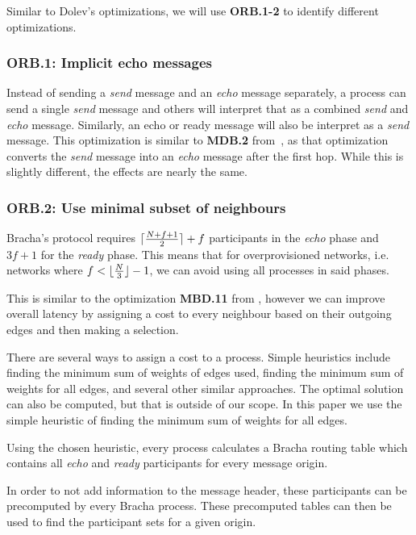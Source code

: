 Similar to Dolev's optimizations, we will use \textbf{ORB.1-2} to identify different optimizations.

\subsubsection{ORB.1: Implicit echo messages}
Instead of sending a \textit{send} message and an \textit{echo} message separately, a process can send a single \textit{send} message and others will interpret that as a combined \textit{send} and \textit{echo} message. Similarly, an echo or ready message will also be interpret as a \textit{send} message. This optimization is similar to \textbf{MDB.2} from~\cite{bonomi2021practical}, as that optimization converts the \textit{send} message into an \textit{echo} message after the first hop. While this is slightly different, the effects are nearly the same.

\subsubsection{ORB.2: Use minimal subset of neighbours}
Bracha's protocol requires $\lceil\frac{N+f+1}{2}\rceil + f$ participants in the \textit{echo} phase and $3f+1$ for the \textit{ready} phase. This means that for overprovisioned networks, i.e. networks where $f < \lfloor\frac{N}{3}\rfloor - 1$, we can avoid using all processes in said phases.

This is similar to the optimization \textbf{MBD.11} from \cite{bonomi2021practical}, however we can improve overall latency by assigning a cost to every neighbour based on their outgoing edges and then making a selection. 

There are several ways to assign a cost to a process. Simple heuristics include finding the minimum sum of weights of edges used, finding the minimum sum of weights for all edges, and several other similar approaches. The optimal solution can also be computed, but that is outside of our scope. In this paper we use the simple heuristic of finding the minimum sum of weights for all edges.

Using the chosen heuristic, every process calculates a Bracha routing table which contains all \textit{echo} and \textit{ready} participants for every message origin.

In order to not add information to the message header, these participants can be precomputed by every Bracha process. These precomputed tables can then be used to find the participant sets for a given origin.

